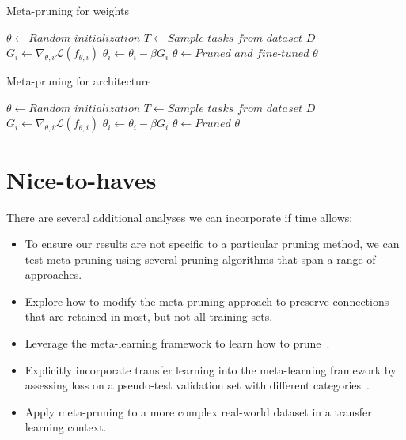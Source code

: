 \documentclass{article}
\begin{document}
\begin{algorithm}[t]
	\caption{Meta-pruning for weights} \label{alg1}
	\begin{algorithmic}[1]
		\State $\theta \gets \textit{Random initialization}$
		\State $T \gets \textit{Sample tasks from dataset } D$
		\State $G_i \gets \nabla_{\theta,i} \mathcal{L} \left(f_{\theta,i}\right)$
		\State $\theta_i \gets \theta_i - \beta G_i$
		\EndFor
		\State $\theta \gets \textit{Pruned and fine-tuned } \theta$
		\EndFor
	\end{algorithmic}
\end{algorithm}

\begin{algorithm}[t]
	\caption{Meta-pruning for architecture} \label{alg2}
	\begin{algorithmic}[1]
		\State $\theta \gets \textit{Random initialization}$
		\State $T \gets \textit{Sample tasks from dataset } D$
		\State $G_i \gets \nabla_{\theta,i} \mathcal{L} \left(f_{\theta,i}\right)$
		\State $\theta_i \gets \theta_i - \beta G_i$
		\EndFor
		\State $\theta \gets \textit{Pruned } \theta$
		\EndFor
	\end{algorithmic}
\end{algorithm}

\section{Nice-to-haves}

There are several additional analyses we can incorporate if time allows:

\begin{itemize}
	\item To ensure our results are not specific to a particular pruning method, we can test meta-pruning using several pruning algorithms that span a range of approaches.
	\item Explore how to modify the meta-pruning approach to preserve connections that are retained in most, but not all training sets.
	\item Leverage the meta-learning framework to learn how to prune~\citet{NIPS_learning_weights_pruning}.
	\item Explicitly incorporate transfer learning into the meta-learning framework by assessing loss on a pseudo-test validation set with different categories~\citet{metalearning2}.
	\item Apply meta-pruning to a more complex real-world dataset in a transfer learning context.
\end{itemize}
\end{document}
